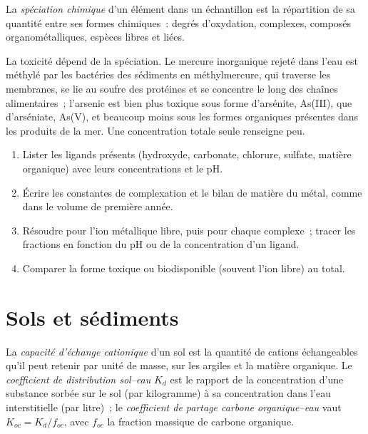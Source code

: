 \begin{definition}[Spéciation]\label{def:b3:environmental-toxicology:speciation}
La \emph{spéciation chimique} d'un élément dans un
échantillon est la répartition de sa quantité entre ses formes
chimiques~: degrés d'oxydation, complexes, composés organométalliques,
espèces libres et liées.
\end{definition}

La toxicité dépend de la spéciation. Le mercure inorganique rejeté dans
l'eau est méthylé par les bactéries des sédiments en méthylmercure, qui
traverse les membranes, se lie au soufre des protéines et se concentre le
long des chaînes alimentaires~; l'arsenic est bien plus toxique sous forme
d'arsénite, As(III), que d'arséniate, As(V), et beaucoup moins sous les
formes organiques présentes dans les produits de la mer. Une concentration
totale seule renseigne peu.

\begin{method}\label{met:b3:environmental-toxicology:speciation}
\begin{enumerate}
  \item Lister les ligands présents (hydroxyde, carbonate, chlorure,
        sulfate, matière organique) avec leurs concentrations et le pH.
  \item Écrire les constantes de complexation et le bilan de matière du
        métal, comme dans le volume de première année.
  \item Résoudre pour l'ion métallique libre, puis pour chaque complexe~;
        tracer les fractions en fonction du pH ou de la concentration d'un
        ligand.
  \item Comparer la forme toxique ou biodisponible (souvent l'ion libre)
        au total.
\end{enumerate}
\end{method}

\section{Sols et sédiments}

\begin{definition}\label{def:b3:environmental-toxicology:soil}
La \emph{capacité d'échange cationique} d'un sol est la
quantité de cations échangeables qu'il peut retenir par unité de masse,
sur les argiles et la matière organique. Le \emph{coefficient de distribution sol--eau}
$K_d$ est le rapport de la concentration d'une substance
sorbée sur le sol (par kilogramme) à sa concentration dans l'eau
interstitielle (par litre)~; le \emph{coefficient de partage carbone organique--eau}
vaut $K_{oc} = K_d/f_{oc}$, avec $f_{oc}$ la fraction massique de carbone organique.
\end{definition}

